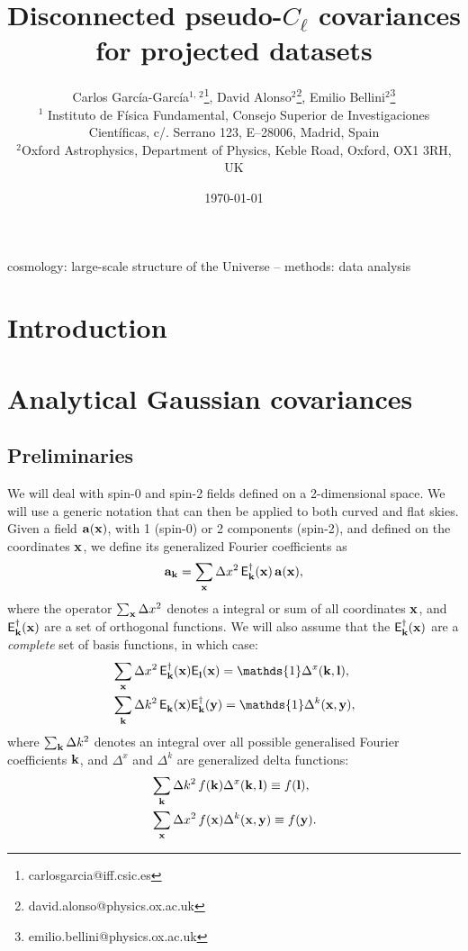 \documentclass[useAMS,usenatbib]{mn2e}
\title[Disconnected pseudo-$C_\ell$ covariances for projected datasets]{Disconnected pseudo-$C_\ell$ covariances for projected datasets}
\author[C. Garc\'{i}a-Garc\'{i}a et al.]{Carlos Garc\'{i}a-Garc\'{i}a$^{1,\,2}$\thanks{carlosgarcia@iff.csic.es}, David Alonso$^2$\thanks{david.alonso@physics.ox.ac.uk}, Emilio Bellini$^2$\thanks{emilio.bellini@physics.ox.ac.uk}\\
$^{1}$ Instituto de Física Fundamental, Consejo Superior de Investigaciones
Científicas, c/. Serrano 123, E–28006, Madrid, Spain\\
$^{2}$Oxford Astrophysics, Department of Physics, Keble Road, Oxford, OX1 3RH, UK
}
\newcommand{\summ}[1]{\sum_{\bf #1}\Delta #1^2}
\newcommand{\Ylm}[3]{{\sf E}^{#1}_{\bf #2}({\bf #3})}
\begin{document}
  \date{\today}
   
  \maketitle

\begin{abstract}
\end{abstract}

\begin{keywords}
  cosmology: large-scale structure of the Universe -- methods: data analysis
\end{keywords}

\section{Introduction}
    
\section{Analytical Gaussian covariances}

  \subsection{Preliminaries}
    We will deal with spin-0 and spin-2 fields defined on a 2-dimensional space. We will use a generic notation that can then be applied to both curved and flat skies. Given a field ${\bf a}({\bf x})$, with 1 (spin-0) or 2 components (spin-2), and defined on the coordinates ${\bf x}$, we define its generalized Fourier coefficients as
    \begin{equation}
      {\bf a}_{\bf k}=\summ{x}\,\Ylm{\dag}{k}{x}\,{\bf a}({\bf x}),
    \end{equation}
    where the operator $\summ{x}$ denotes a integral or sum of all coordinates ${\bf x}$, and $\Ylm{\dag}{k}{x}$ are a set of orthogonal functions. We will also assume that the $\Ylm{\dag}{k}{x}$ are a \emph{complete} set of basis functions, in which case:
    \begin{align}
      &\summ{x}\,\Ylm{\dag}{k}{x}\Ylm{}{l}{x}=\mathds{1}\Delta^x({\bf k},{\bf l}),\\
      &\summ{k}\,\Ylm{}{k}{x}\Ylm{\dag}{k}{y}=\mathds{1}\Delta^k({\bf x},{\bf y}),
    \end{align}
    where $\summ{k}$ denotes an integral over all possible generalised Fourier coefficients ${\bf k}$, and $\Delta^x$ and $\Delta^k$ are generalized delta functions:
    \begin{align}
      &\summ{k}\,f({\bf k})\Delta^x({\bf k},{\bf l})\equiv f({\bf l}),\\
      &\summ{x}\,f({\bf x})\Delta^k({\bf x},{\bf y})\equiv f({\bf y}).
    \end{align}
    
\end{document}
